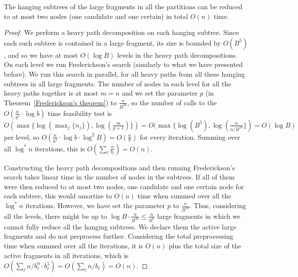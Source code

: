 \documentclass[a4paper,UKenglish]{lipics-v2016}
\theoremstyle{plain}
\begin{document}
\begin{lemma}\label{lemma1}
The hanging subtrees of the large fragments in all the partitions can be reduced to at most two nodes (one candidate and one certain) in total $O(n)$ time. 
\end{lemma}
\begin{proof}
We perform a heavy path decomposition on each hanging subtree. Since each such subtree is contained in a large fragment, its 
size is bounded by $O(B^5)$, and so we have at most $O(\log B)$ levels in the heavy 
path decompositions. On each level we run Frederickson's search (similarly to what we have presented before).
We run this search in parallel, for all heavy paths from all these hanging subtrees in all large fragments.
The number of  nodes in each level for all the heavy paths together is at most $m=n$ and we set
the parameter $p$ (in Theorem~\ref{Frederickson's theorem}) to $\frac{n}{B^{10}}$, so the number of calls to the $O(\frac{n}{b^4} \cdot \log b)$ time feasibility test
is $O(\max \lbrace \log(\max_{j} \lbrace n_j \rbrace), \log(\frac{m}{p+1}) \rbrace) = O(\max \lbrace \log (B^{5}), \log(\frac{n}{n/B^{10}} \rbrace) = O(\log B)$ per level, so
$O(\frac{n}{b^4} \cdot \log b \cdot \log^{2} B) = O(\frac{n}{b})$ for every iteration.
Summing over all $\log^{*}n$ iterations, this is $O(\sum_{\ell}\frac{n}{b_\ell}) = O(n)$.

Constructing the heavy path decompositions and then running Frederickson's search takes linear time in the number
of nodes in the subtrees. If all of them were then reduced to at most two nodes, one candidate and one certain
node for each subtree, this would amortize to $O(n)$ time when summed over all the $\log^{*}n$  iterations. However, we have set
the parameter $p$ to $\frac{n}{B^{10}}$. Thus, considering all the levels, there
might be up to $\log B\cdot\frac{n}{B^{10}}\leq \frac{n}{B^{9}}$ large fragments in which we cannot fully reduce
all the hanging subtrees. We declare them the active large fragments and do not preprocess further.
Considering the total preprocessing time when summed over all the iterations, it is $O(n)$
plus the total size of the active fragments in all iterations, which is $O(\sum_{\ell} n/b_{\ell}^{9}\cdot b_{\ell}^{5})=O(\sum_{\ell} n/b_{\ell})=O(n)$.
\end{proof}
\end{document}
